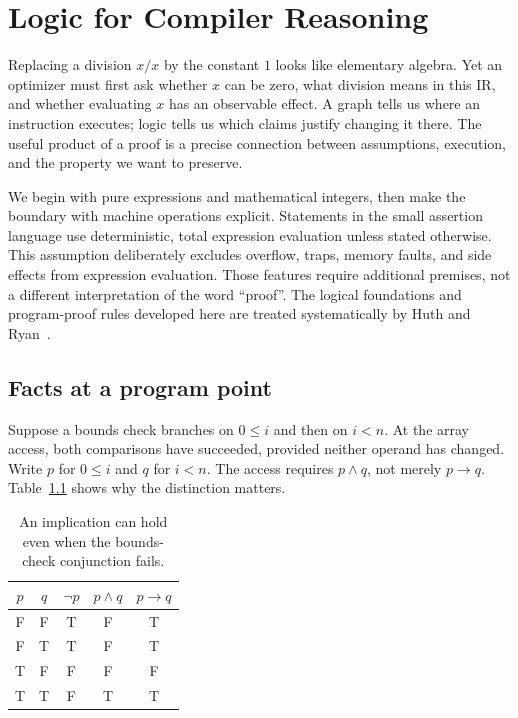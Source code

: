 \chapter{Logic for Compiler Reasoning}
\label{ch:logic-compiler-reasoning}

Replacing a division $x/x$ by the constant $1$ looks like elementary algebra.
Yet an optimizer must first ask whether $x$ can be zero, what division means in this IR, and whether evaluating $x$ has an observable effect.
A graph tells us where an instruction executes; logic tells us which claims justify changing it there.
The useful product of a proof is a precise connection between assumptions, execution, and the property we want to preserve.

We begin with pure expressions and mathematical integers, then make the boundary with machine operations explicit.
Statements in the small assertion language use deterministic, total expression evaluation unless stated otherwise.
This assumption deliberately excludes overflow, traps, memory faults, and side effects from expression evaluation.
Those features require additional premises, not a different interpretation of the word \enquote{proof}.
The logical foundations and program-proof rules developed here are treated systematically by Huth and Ryan~\cite{huth-2004-logic}.

\section{Facts at a program point}
\label{sec:ch40-facts}

Suppose a bounds check branches on $0\leq i$ and then on $i<n$.
At the array access, both comparisons have succeeded, provided neither operand has changed.
Write $p$ for $0\leq i$ and $q$ for $i<n$.
The access requires $p\land q$, not merely $p\rightarrow q$.
Table~\ref{tab:ch40-truth} shows why the distinction matters.

\begin{table}
\caption{An implication can hold even when the bounds-check conjunction fails.}
\label{tab:ch40-truth}
\centering
\begin{tabular}{ccccc}
\toprule
$p$ & $q$ & $\neg p$ & $p\land q$ & $p\rightarrow q$ \\
\midrule
F & F & T & F & T \\
F & T & T & F & T \\
T & F & F & F & F \\
T & T & F & T & T \\
\bottomrule
\end{tabular}
\end{table}

